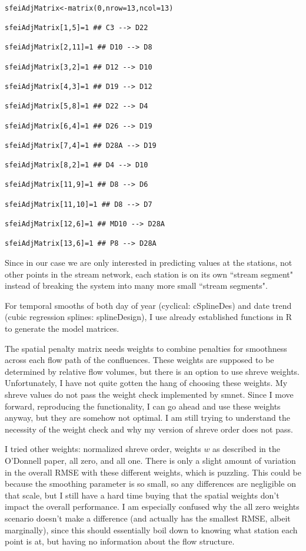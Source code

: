 \documentclass[12pt]{amsart}
\begin{document}
\begin{verbatim}

sfeiAdjMatrix<-matrix(0,nrow=13,ncol=13)

sfeiAdjMatrix[1,5]=1 ## C3 --> D22

sfeiAdjMatrix[2,11]=1 ## D10 --> D8

sfeiAdjMatrix[3,2]=1 ## D12 --> D10

sfeiAdjMatrix[4,3]=1 ## D19 --> D12

sfeiAdjMatrix[5,8]=1 ## D22 --> D4

sfeiAdjMatrix[6,4]=1 ## D26 --> D19

sfeiAdjMatrix[7,4]=1 ## D28A --> D19

sfeiAdjMatrix[8,2]=1 ## D4 --> D10

sfeiAdjMatrix[11,9]=1 ## D8 --> D6

sfeiAdjMatrix[11,10]=1 ## D8 --> D7

sfeiAdjMatrix[12,6]=1 ## MD10 --> D28A

sfeiAdjMatrix[13,6]=1 ## P8 --> D28A
\end{verbatim}

Since in our case we are only interested in predicting values at the stations, not other points in the stream network, each station is on its own ``stream segment" instead of breaking the system into many more small ``stream segments". 

For temporal smooths of both day of year (cyclical: cSplineDes) and date trend (cubic regression splines: splineDesign), I use already established functions in R to generate the model matrices.

The spatial penalty matrix needs weights to combine penalties for smoothness across each flow path of the confluences. These weights are supposed to be determined by relative flow volumes, but there is an option to use shreve weights. Unfortunately, I have not quite gotten the hang of choosing these weights. My shreve values do not pass the weight check implemented by smnet. Since I move forward, reproducing the functionality, I can go ahead and use these weights anyway, but they are somehow not optimal. I am still trying to understand the necessity of the weight check and why my version of shreve order does not pass.

I tried other weights: normalized shreve order, weights $w$ as described in the O'Donnell paper, all zero, and all one. There is only a slight amount of variation in the overall RMSE with these different weights, which is puzzling. This could be because the smoothing parameter is so small, so any differences are negligible on that scale, but I still have a hard time buying that the spatial weights don't impact the overall performance. I am especially confused why the all zero weights scenario doesn't make a difference (and actually has the smallest RMSE, albeit marginally), since this should essentially boil down to knowing what station each point is at, but having no information about the flow structure.
\end{document}
